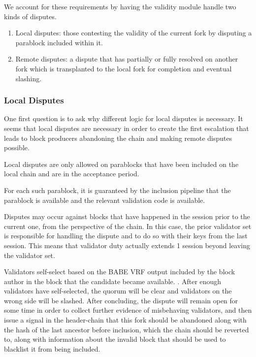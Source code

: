 We account for these requirements by having the validity module handle two kinds
of disputes.

\begin{enumerate}
    \item Local disputes: those contesting the validity of the current fork by
    disputing a parablock included within it.
    \item Remote disputes: a dispute that has partially or fully resolved on
    another fork which is transplanted to the local fork for completion and
    eventual slashing.
\end{enumerate}

\subsubsection{Local Disputes}

\newline

One first question is to ask why different logic for local disputes is
necessary. It seems that local disputes are necessary in order to create the
first escalation that leads to block producers abandoning the chain and making
remote disputes possible.
\newline

Local disputes are only allowed on parablocks that have been included on the
local chain and are in the acceptance period.
\newline

For each such parablock, it is guaranteed by the inclusion pipeline that the
parablock is available and the relevant validation code is available.
\newline

Disputes may occur against blocks that have happened in the session prior to the
current one, from the perspective of the chain. In this case, the prior
validator set is responsible for handling the dispute and to do so with their
keys from the last session. This means that validator duty actually extends 1
session beyond leaving the validator set.
\newline

Validators self-select based on the BABE VRF output included by the block author
in the block that the candidate became available. . After enough validators have self-selected, the quorum will be
clear and validators on the wrong side will be slashed. After concluding, the
dispute will remain open for some time in order to collect further evidence of
misbehaving validators, and then issue a signal in the header-chain that this
fork should be abandoned along with the hash of the last ancestor before
inclusion, which the chain should be reverted to, along with information about
the invalid block that should be used to blacklist it from being included.

